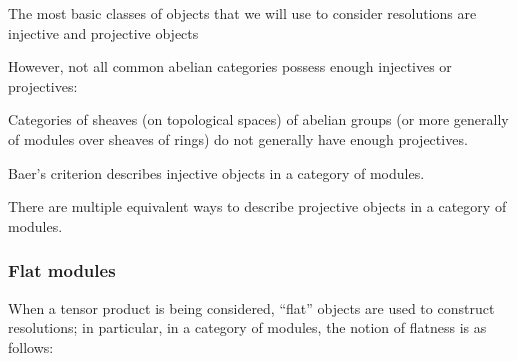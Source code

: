 The most basic classes of objects that we will use to consider resolutions are injective and projective objects








However, not all common abelian categories possess enough injectives or projectives:


Categories of sheaves (on topological spaces) of abelian groups (or more generally of modules over sheaves of rings) do not generally have enough projectives.



Baer's criterion describes injective objects in a category of modules.


There are multiple equivalent ways to describe projective objects in a category of modules.













\subsubsection{Flat modules}

When a tensor product is being considered, ``flat'' objects are used to construct resolutions; in particular, in a category of modules, the notion of flatness is as follows:



